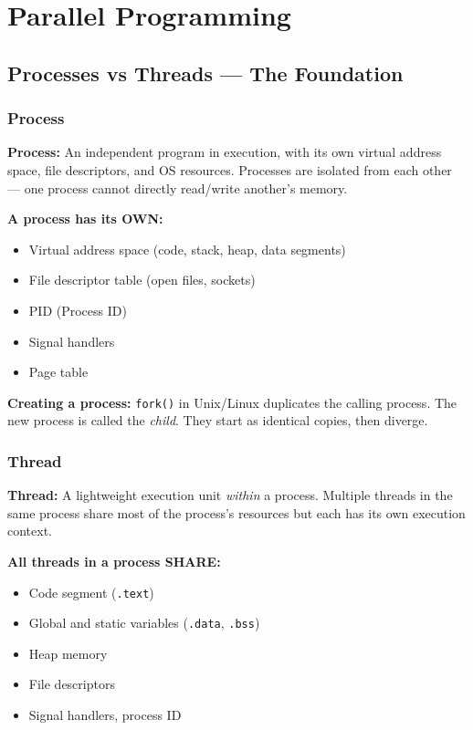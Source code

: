 \documentclass[11pt,a4paper]{article}
\newcommand{\code}[1]{\texttt{\small\colorbox{codebg}{\color{codekw}#1}}}
\begin{document}
\section{Parallel Programming}

\subsection{Processes vs Threads --- The Foundation}

\subsubsection{Process}

\begin{mydef}
\textbf{Process:} An independent program in execution, with its own virtual address space, file descriptors, and OS resources. Processes are isolated from each other --- one process cannot directly read/write another's memory.
\end{mydef}

\textbf{A process has its OWN:}
\begin{itemize}[noitemsep]
  \item Virtual address space (code, stack, heap, data segments)
  \item File descriptor table (open files, sockets)
  \item PID (Process ID)
  \item Signal handlers
  \item Page table
\end{itemize}

\textbf{Creating a process:} \code{fork()} in Unix/Linux duplicates the calling process. The new process is called the \textit{child}. They start as identical copies, then diverge.

\subsubsection{Thread}

\begin{mydef}
\textbf{Thread:} A lightweight execution unit \textit{within} a process. Multiple threads in the same process share most of the process's resources but each has its own execution context.
\end{mydef}

\textbf{All threads in a process SHARE:}
\begin{itemize}[noitemsep]
  \item Code segment (\code{.text})
  \item Global and static variables (\code{.data}, \code{.bss})
  \item Heap memory
  \item File descriptors
  \item Signal handlers, process ID
\end{itemize}
\end{document}
